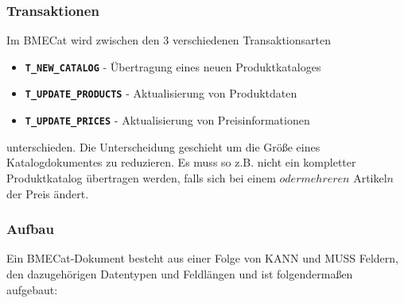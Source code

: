 	\subsubsection{Transaktionen}
	Im BMECat wird zwischen den 3 verschiedenen Transaktionsarten
	\begin{itemize}[noitemsep]
	\item \texttt{\textbf{T\_NEW\_CATALOG}} - Übertragung eines neuen Produktkataloges
	\item \texttt{\textbf{T\_UPDATE\_PRODUCTS}} - Aktualisierung von Produktdaten
	\item \texttt{\textbf{T\_UPDATE\_PRICES}} - Aktualisierung von Preisinformationen
	\end{itemize} 
	unterschieden. Die Unterscheidung geschieht um die Größe eines Katalogdokumentes zu reduzieren. Es muss so z.B. nicht ein kompletter Produktkatalog übertragen werden, falls sich bei einem \(oder mehreren\) Artikel\(n\) der Preis ändert.
	
	\subsubsection{Aufbau}
	
	Ein BMECat-Dokument besteht aus einer Folge von KANN und MUSS Feldern, den dazugehörigen Datentypen und Feldlängen und ist folgendermaßen aufgebaut:
		
